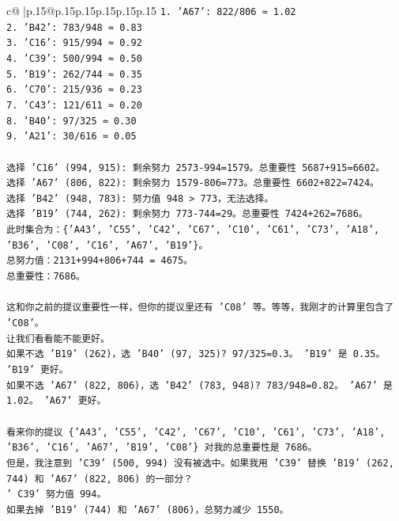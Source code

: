 \documentclass{article}
\begin{document}
{\begin{supertabular}{c@{$\;$}|p{.15\linewidth}@{}p{.15\linewidth}p{.15\linewidth}p{.15\linewidth}p{.15\linewidth}p{.15\linewidth}}
{{{\texttt{1. 'A67': 822/806 ≈ 1.02} \\
\texttt{2. 'B42': 783/948 ≈ 0.83} \\
\texttt{3. 'C16': 915/994 ≈ 0.92} \\
\texttt{4. 'C39': 500/994 ≈ 0.50} \\
\texttt{5. 'B19': 262/744 ≈ 0.35} \\
\texttt{6. 'C70': 215/936 ≈ 0.23} \\
\texttt{7. 'C43': 121/611 ≈ 0.20} \\
\texttt{8. 'B40': 97/325 ≈ 0.30} \\
\texttt{9. 'A21': 30/616 ≈ 0.05} \\
\\ 
\texttt{选择 'C16' (994, 915): 剩余努力 2573{-}994=1579。总重要性 5687+915=6602。} \\
\texttt{选择 'A67' (806, 822): 剩余努力 1579{-}806=773。总重要性 6602+822=7424。} \\
\texttt{选择 'B42' (948, 783): 努力值 948 > 773，无法选择。} \\
\texttt{选择 'B19' (744, 262): 剩余努力 773{-}744=29。总重要性 7424+262=7686。} \\
\texttt{此时集合为：\{'A43', 'C55', 'C42', 'C67', 'C10', 'C61', 'C73', 'A18', 'B36', 'C08', 'C16', 'A67', 'B19'\}。} \\
\texttt{总努力值：2131+994+806+744 = 4675。} \\
\texttt{总重要性：7686。} \\
\\ 
\texttt{这和你之前的提议重要性一样，但你的提议里还有 'C08' 等。等等，我刚才的计算里包含了 'C08'。} \\
\texttt{让我们看看能不能更好。} \\
\texttt{如果不选 'B19' (262)，选 'B40' (97, 325)? 97/325=0.3。 'B19' 是 0.35。 'B19' 更好。} \\
\texttt{如果不选 'A67' (822, 806)，选 'B42' (783, 948)? 783/948=0.82。 'A67' 是 1.02。 'A67' 更好。} \\
\\ 
\texttt{看来你的提议 \{'A43', 'C55', 'C42', 'C67', 'C10', 'C61', 'C73', 'A18', 'B36', 'C16', 'A67', 'B19', 'C08'\} 对我的总重要性是 7686。} \\
\texttt{但是，我注意到 'C39' (500, 994) 没有被选中。如果我用 'C39' 替换 'B19' (262, 744) 和 'A67' (822, 806) 的一部分？} \\
\texttt{' C39' 努力值 994。} \\
\texttt{如果去掉 'B19' (744) 和 'A67' (806)，总努力减少 1550。} \\
}}}
\end{supertabular}}
\end{document}

